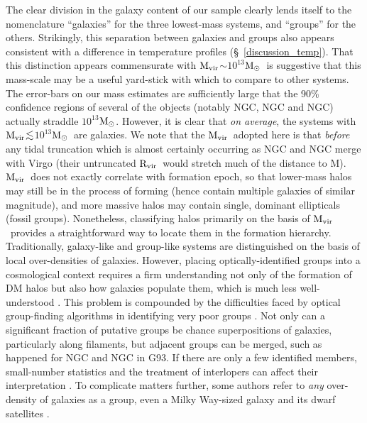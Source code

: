 \documentclass{emulateapj}
\def\spose#1{\hbox to 0pt{#1\hss}}
\def\ltsim{$\mathrel{\spose{\lower 3pt\hbox{$\sim$}} 
        \raise 2.0pt\hbox{$<$}}$\thinspace}
\def \msun {${\rm M_\odot}$}
\def \eg {e.g.}
\newcommand{\mvir}{${\rm M_{vir}}$}
\newcommand{\rvir }{${\rm R_{vir}}$}
\newcommand{\thin}{\thinspace}
\begin{document}
The clear division in the galaxy content of our sample clearly lends itself
to the nomenclature  ``galaxies'' for the three lowest-mass systems,
and ``groups'' for the others. Strikingly, this separation 
between galaxies and groups also appears consistent with a difference in 
temperature profiles  (\S~\ref{discussion_temp}).
That this distinction appears commensurate with
\mvir$\sim 10^{13}$\msun\ is suggestive that this mass-scale may be a useful
yard-stick with which to compare to other systems. 
The error-bars on our mass estimates are sufficiently large that
the 90\% confidence regions of several of the objects (notably
NGC\thin 720, NGC\thin 6482 and NGC\thin 1407) actually straddle 
$10^{13}$\msun. However, it is clear that {\em on average}, the systems
with \mvir \ltsim $10^{13}$\msun\ are galaxies. We note that the \mvir\ adopted here
is that {\em before}
any tidal truncation which is almost certainly occurring as NGC\thin 4472
and NGC\thin 4649 merge with Virgo (their untruncated \rvir\ would stretch
much of the distance to M\thin 87).
\mvir\ does not exactly correlate with formation epoch,
so that lower-mass halos may still be in the process of forming 
(hence contain multiple galaxies of similar magnitude), and  more 
massive halos may contain single, dominant ellipticals (fossil groups).
Nonetheless, classifying halos primarily on the basis of 
\mvir\ provides a straightforward way to locate them in the formation hierarchy.
Traditionally, galaxy-like and group-like systems are distinguished
on the basis of local over-densities of galaxies.  However,
placing optically-identified groups into a cosmological context
requires a firm understanding not only of the formation of DM halos
but also how galaxies populate them, which is much less
well-understood \citep[\eg][]{kravtsov04a}.
This problem is compounded by the difficulties faced by optical group-finding
algorithms in identifying very poor groups \citep[\eg][]{gerke05a}. Not only
can a significant fraction of putative groups be chance superpositions of 
galaxies, particularly along filaments, but adjacent groups can be merged,
such as happened for NGC\thin 4649 and NGC\thin 4472 in G93. If there are
only a few identified members, small-number statistics and the treatment of 
interlopers can affect their interpretation \citep[\eg][]{gould93a}.
To complicate matters further, some authors refer to 
{\em any} over-density of galaxies as a group, even a Milky Way-sized 
galaxy and its dwarf satellites \citep[\eg][]{tully05a}.
\end{document}
